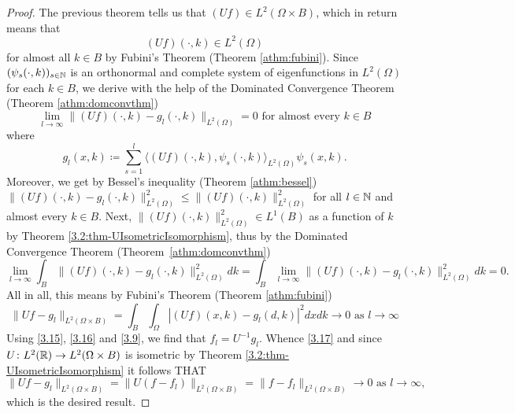 \begin{theorem}
	\begin{proof}
		The previous theorem tells us that $(Uf) \in L^{2}(\Omega \times B)$, which in return means that 
		\[ (Uf)(\cdot, k) \in L^{2}(\Omega) \]
		 for almost all $k \in B$ by Fubini's Theorem (Theorem \ref{athm:fubini}). Since $(\psi_{s}(\cdot, k))_{s \in \mathbb{N}}$ is an orthonormal and complete system of eigenfunctions in $L^{2}(\Omega)$ for each $k \in B$, we derive with the help of the Dominated Convergence Theorem (Theorem \ref{athm:domconvthm})
			\[ \lim_{l \rightarrow \infty} \| (Uf)(\cdot, k) - g_{l}(\cdot, k) \|_{L^{2}(\Omega)} = 0 \text{ for almost every } k \in B \]
		where 
			\begin{equation}
				g_{l}(x, k) \coloneqq \sum_{s=1}^{l} \langle(Uf)(\cdot, k), \psi_{s}(\cdot,k)\rangle_{L^{2}(\Omega)} \psi_{s}(x,k). \label{3.16}
			\end{equation}
		Moreover, we get by Bessel's inequality (Theorem \ref{athm:bessel}) $\| (Uf)(\cdot, k) - g_{l}(\cdot, k) \|^{2}_{L^{2}(\Omega)} \leq \| (Uf)(\cdot, k) \|^{2}_{L^{2}(\Omega)}$ for all $l \in \mathbb{N}$ and almost every $k \in B$. Next, $\|(Uf)(\cdot, k)\|^{2}_{L^{2}(\Omega)} \in L^{1}(B)$ as a function of $k$ by Theorem \ref{3.2:thm-UIsometricIsomorphism}, thus by the Dominated Convergence Theorem (Theorem \ref{athm:domconvthm})
		\[ \lim_{l \rightarrow \infty} \int_{B} \| (Uf)(\cdot, k) - g_{l}(\cdot, k) \|^{2}_{L^{2}(\Omega)} dk  = \int_{B} \lim_{l \rightarrow \infty}  \| (Uf)(\cdot, k) - g_{l}(\cdot, k) \|^{2}_{L^{2}(\Omega)} dk = 0. \]
		  All in all, this means by Fubini's Theorem (Theorem \ref{athm:fubini})
			\begin{equation}
				\| U f - g_{l} \|_{L^{2}(\Omega \times B)} = \int_{B} \int_{\Omega} \left| (Uf)(x, k) - g_{l}(d, k) \right|^{2} dx dk \rightarrow 0 \text{ as } l \rightarrow \infty \label{3.17}
			\end{equation} 
		 Using \eqref{3.15}, \eqref{3.16} and \eqref{3.9}, we find that $f_{l} = U^{-1}g_{l}$. Whence \eqref{3.17} and since $U \colon L^{2}(\mathbb{R}) \rightarrow L^{2}(\Omega \times B)$ is isometric by Theorem \ref{3.2:thm-UIsometricIsomorphism} it follows THAT
			\[ \| U f - g_{l} \|_{L^{2}(\Omega \times B)} = \| U(f - f_{l}) \|_{L^{2}(\Omega \times B)} = \| f - f_{l} \|_{L^{2}(\Omega \times B)} \rightarrow 0 \text{ as } l \rightarrow \infty,\]
		 which is the desired result.
	\end{proof}
\end{theorem}